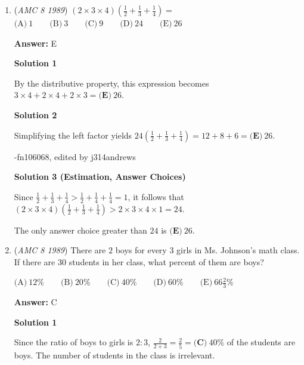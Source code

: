 \begin{enumerate}
\textbf{Solution 3}

The  $n$ dimes' values need to sum to $10$ quarters and $10$ dimes.
 \[10n=10\cdot25 + 10\cdot 10\] we can divide both sides by $10$.
 \[n=25+10=35\]So, our answer is $\boxed{\text{D}}$----stjwyl

 


	\item (\textit{AMC 8 1989}) $(2\times 3\times 4)\left(\frac{1}{2}+\frac{1}{3}+\frac{1}{4}\right) =$
$\text{(A)}\ 1 \qquad \text{(B)}\ 3 \qquad \text{(C)}\ 9 \qquad \text{(D)}\ 24 \qquad \text{(E)}\ 26$

 \textbf{Answer: }E



\textbf{Solution 1}

By the distributive property, this expression becomes $3\times 4+2\times 4+2\times 3 = \boxed{\textbf{(E)}\ 26}$.

 



\textbf{Solution 2}

Simplifying the left factor yields $24\left(\frac12+\frac13+\frac14\right)= 12 + 8 + 6 = \boxed{\textbf{(E)} \ 26}$.

 -fn106068, edited by j314andrews

 



\textbf{Solution 3 (Estimation, Answer Choices)}

Since $\frac12+\frac13+\frac14 > \frac12+\frac14+\frac14 = 1$, it follows that $(2\times 3\times 4)\left(\frac{1}{2}+\frac{1}{3}+\frac{1}{4}\right) > 2\times 3\times 4 \times 1 = 24$. 

 The only answer choice greater than $24$ is $\boxed{\textbf{(E)}\ 26}$.

 


 


	\item (\textit{AMC 8 1989}) There are $2$ boys for every $3$ girls in Ms. Johnson's math class.  If there are $30$ students in her class, what percent of them are boys?


 $\text{(A)}\ 12\% \qquad \text{(B)}\ 20\% \qquad \text{(C)}\ 40\% \qquad \text{(D)}\ 60\% \qquad \text{(E)}\ 66\frac{2}{3}\%$

 \textbf{Answer: }C



\textbf{Solution 1}

Since the ratio of boys to girls is $2:3$, $\frac{2}{2+3} = \frac{2}{5} = \boxed{\textbf{(C)}\ 40\%}$ of the students are boys.  The number of students in the class is irrelevant.


\end{enumerate}

